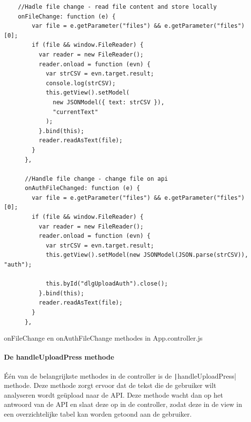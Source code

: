 \begin{listing}[H]
\begin{verbatim}
    //Hadle file change - read file content and store locally
    onFileChange: function (e) {
        var file = e.getParameter("files") && e.getParameter("files")[0];
        if (file && window.FileReader) {
          var reader = new FileReader();
          reader.onload = function (evn) {
            var strCSV = evn.target.result;
            console.log(strCSV);
            this.getView().setModel(
              new JSONModel({ text: strCSV }),
              "currentText"
            );
          }.bind(this);
          reader.readAsText(file);
        }
      },

      //Handle file change - change file on api
      onAuthFileChanged: function (e) {
        var file = e.getParameter("files") && e.getParameter("files")[0];
        if (file && window.FileReader) {
          var reader = new FileReader();
          reader.onload = function (evn) {
            var strCSV = evn.target.result;
            this.getView().setModel(new JSONModel(JSON.parse(strCSV)), "auth");

            this.byId("dlgUploadAuth").close();
          }.bind(this);
          reader.readAsText(file);
        }
      },
\end{verbatim}
\caption{onFileChange en onAuthFileChange methodes in App.controller.js}
\end{listing}

\paragraph{De handleUploadPress methode}

Één van de belangrijkste methodes in de controller is de \texttt|handleUploadPress| methode. Deze methode zorgt ervoor dat de tekst die de gebruiker wilt analyseren wordt geüpload naar de API. Deze methode wacht dan op het antwoord van de API en slaat deze op in de controller, zodat deze in de view in een overzichtelijke tabel kan worden getoond aan de gebruiker. 


